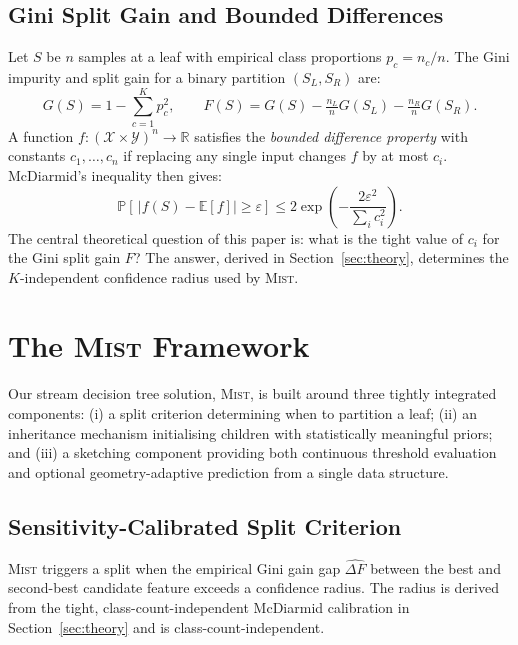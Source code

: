 \documentclass{article}
\newcommand{\mist}{\textsc{Mist}}
\newcommand{\Prob}{\mathbb{P}}
\begin{document}
\subsection{Gini Split Gain and Bounded Differences}
Let $S$ be $n$ samples at a leaf with empirical class proportions $p_c = n_c/n$.
The Gini impurity and split gain for a binary partition $(S_L, S_R)$ are:
\begin{equation}
  G(S) = 1 - \sum_{c=1}^K p_c^2, \qquad
  F(S) = G(S) - \tfrac{n_L}{n}G(S_L) - \tfrac{n_R}{n}G(S_R).
  \label{eq:gain}
\end{equation}
A function $f : (\mathcal{X} \times \mathcal{Y})^n \to \mathbb{R}$ satisfies the \emph{bounded difference
property} with constants $c_1,\ldots,c_n$ if replacing any single input changes
$f$ by at most $c_i$. McDiarmid's inequality then gives:
\begin{equation}
\Prob\!\left[\,|f(S) - \mathbb{E}[f]| \geq \varepsilon\right]
\leq 2\exp\!\left(-\frac{2\varepsilon^2}{\sum_i c_i^2}\right).
\label{eq:mcdiarmid}
\end{equation}
The central theoretical question of this paper is: what is the tight value
of $c_i$ for the Gini split gain $F$? The answer, derived in
Section~\ref{sec:theory}, determines the $K$-independent confidence radius
used by \mist{}.
\section{The \mist{} Framework}
\label{sec:framework}
Our stream decision tree solution, \mist{}, is built around three tightly integrated components: (i) a split criterion determining when to partition a leaf; (ii) an inheritance mechanism initialising children with statistically meaningful priors; and (iii) a sketching component providing both continuous threshold evaluation and optional geometry-adaptive prediction from a single data structure.
\subsection{Sensitivity-Calibrated Split Criterion}
\label{sec:split}
\mist{} triggers a split when the empirical Gini gain gap $\widehat{\Delta F}$
between the best and second-best candidate feature exceeds a confidence
radius. The radius is derived from the tight, class-count-independent McDiarmid calibration in
Section~\ref{sec:theory} and is class-count-independent.
\end{document}
